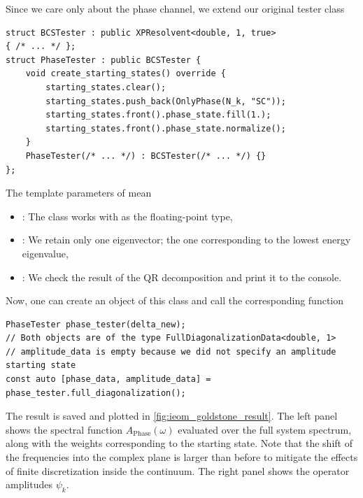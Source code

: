 \documentclass[11pt]{article}
\newcommand{\code}[1]{%
  \texttt{\detokenize{#1}}%
}
\newcommand{\class}[1]{%
  \hyperref[class:#1]{\textcolor{classcolor}{\code{#1}}}%
}
\begin{document}
Since we care only about the phase channel, we extend our original tester class
\begin{lstlisting}
struct BCSTester : public XPResolvent<double, 1, true> 
{ /* ... */ };
struct PhaseTester : public BCSTester {
    void create_starting_states() override {
        starting_states.clear();
        starting_states.push_back(OnlyPhase(N_k, "SC"));
        starting_states.front().phase_state.fill(1.);
        starting_states.front().phase_state.normalize();
    }
    PhaseTester(/* ... */) : BCSTester(/* ... */) {}
};
\end{lstlisting}
The template parameters of \class{XPResolvent} mean
\begin{itemize}
    \item \code{double}: The class works with \code{double} as the floating-point type,
    \item \code{1}: We retain only one eigenvector; the one corresponding to the lowest energy eigenvalue,
    \item \code{true}: We check the result of the QR decomposition and print it to the console.
\end{itemize}
Now, one can create an object of this class and call the corresponding function
\begin{lstlisting}
PhaseTester phase_tester(delta_new);
// Both objects are of the type FullDiagonalizationData<double, 1>
// amplitude_data is empty because we did not specify an amplitude starting state
const auto [phase_data, amplitude_data] = phase_tester.full_diagonalization();
\end{lstlisting}
The result is saved and plotted in \cref{fig:ieom_goldstone_result}.
The left panel shows the spectral function $A_\mathrm{Phase}(\omega)$ evaluated over the full system spectrum, along with the weights corresponding to the starting state.
Note that the shift of the frequencies into the complex plane is larger than before to mitigate the effects of finite discretization inside the continuum.
The right panel shows the operator amplitudes $\psi_k$.
\end{document}
